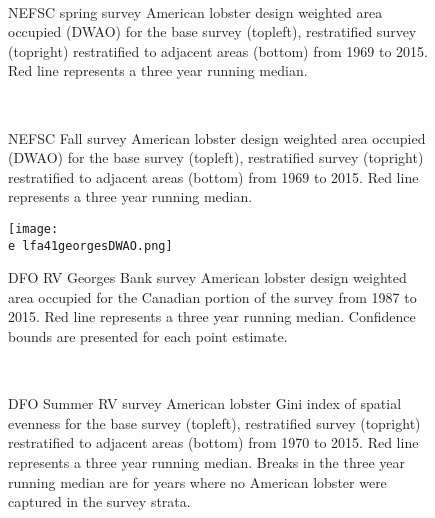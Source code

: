 \documentclass[11pt]{article}
\newcommand{\e}{/backup/bio_data/bio.lobster/figures/}
\begin{document}
\begin{figure}
\centering
{}
\\
\caption{NEFSC spring survey American lobster design weighted area occupied (DWAO) for the base survey (topleft), restratified survey (topright) restratified to adjacent areas (bottom) from 1969 to 2015. Red line represents a three year running median. }
\end{figure}
\clearpage


\begin{figure}
\centering
{}
\\
\caption{NEFSC Fall survey American lobster design weighted area occupied (DWAO) for the base survey (topleft), restratified survey (topright) restratified to adjacent areas (bottom) from 1969 to 2015. Red line represents a three year running median. }
\end{figure}
\clearpage


\begin{figure}

    \texttt{[image: \\e lfa41georgesDWAO.png]}
    \caption{DFO RV Georges Bank survey American lobster design weighted area occupied for the Canadian portion of the survey from 1987 to 2015. Red line represents a three year running median. Confidence bounds are presented for each point estimate.}

\end{figure}


\begin{figure}
\centering
{}
\\
\caption{DFO Summer RV survey American lobster Gini index of spatial evenness for the base survey (topleft), restratified survey (topright) restratified to adjacent areas (bottom) from 1970 to 2015. Red line represents a three year running median. Breaks in the three year running median are for years where no American lobster were captured in the survey strata.}
\end{figure}
\clearpage
\end{document}
